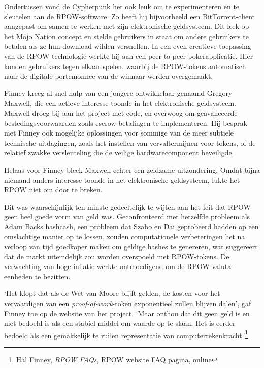 \documentclass[
  a5paper,
  smalldemyvopaper,11pt,twoside,onecolumn,openright,extrafontsizes,
hidelinks]{memoir}
\begin{document}
Ondertussen vond de Cypherpunk het ook leuk om te experimenteren en te
sleutelen aan de RPOW-software. Zo heeft hij bijvoorbeeld een
BitTorrent-client aangepast om samen te werken met zijn elektronische
geldsysteem. Dit leek op het Mojo Nation concept en stelde gebruikers in
staat om andere gebruikers te betalen als ze hun download wilden
versnellen. In een even creatieve toepassing van de RPOW-technologie
werkte hij aan een peer-to-peer pokerapplicatie. Hier konden gebruikers
tegen elkaar spelen, waarbij de RPOW-tokens automatisch naar de digitale
portemonnee van de winnaar werden overgemaakt.

Finney kreeg al snel hulp van een jongere ontwikkelaar genaamd Gregory
Maxwell, die een actieve interesse toonde in het elektronische
geldsysteem. Maxwell droeg bij aan het project met code, en overwoog om
geavanceerde bestedingsvoorwaarden zoals escrow-betalingen te
implementeren. Hij besprak met Finney ook mogelijke oplossingen voor
sommige van de meer subtiele technische uitdagingen, zoals het instellen
van vervaltermijnen voor tokens, of de relatief zwakke versleuteling die
de veilige hardwarecomponent beveiligde.

Helaas voor Finney bleek Maxwell echter een zeldzame uitzondering. Omdat
bijna niemand anders interesse toonde in het elektronische geldsysteem,
lukte het RPOW niet om door te breken.

Dit was waarschijnlijk ten minste gedeeltelijk te wijten aan het feit
dat RPOW geen heel goede vorm van geld was. Geconfronteerd met hetzelfde
probleem als Adam Backs hashcash, een probleem dat Szabo en Dai
geprobeerd hadden op een omslachtige manier op te lossen, zouden
computationele verbeteringen het na verloop van tijd goedkoper maken om
geldige hashes te genereren, wat suggereert dat de markt uiteindelijk
zou worden overspoeld met RPOW-tokens. De verwachting van hoge inflatie
werkte ontmoedigend om de RPOW-valuta-eenheden te bezitten.

`Het klopt dat als de Wet van Moore blijft gelden, de kosten voor het
vervaardigen van een \emph{proof-of-work}-token exponentieel zullen
blijven dalen', gaf Finney toe op de website van het project. `Maar
onthou dat dit geen geld is en niet bedoeld is als een stabiel middel om
waarde op te slaan. Het is eerder bedoeld als een gemakkelijk te ruilen
representatie van computerrekenkracht.'\footnote{Hal Finney, \emph{RPOW
  FAQs}, RPOW website FAQ pagina,
  \href{https://web.archive.org/web/20090217090439/http://rpow.net/faqs.html\#inflation}{online}}
\end{document}
